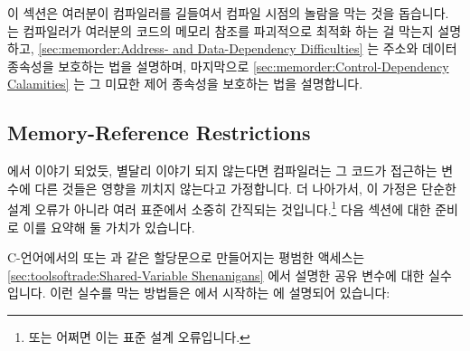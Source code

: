 이 섹션은 여러분이 컴파일러를 길들여서 컴파일 시점의 놀람을 막는 것을 돕습니다.
는 컴파일러가 여러분의 코드의 메모리 참조를 파괴적으로 최적화 하는 걸 막는지
설명하고,
\cref{sec:memorder:Address- and Data-Dependency Difficulties}
는 주소와 데이터 종속성을 보호하는 법을 설명하며, 마지막으로
\cref{sec:memorder:Control-Dependency Calamities}
는 그 미묘한 제어 종속성을 보호하는 법을 설명합니다.

\subsection{Memory-Reference Restrictions}
\label{sec:memorder:Memory-Reference Restrictions}

 에서 이야기 되었듯, 별달리
이야기 되지 않는다면 컴파일러는 그 코드가 접근하는 변수에 다른 것들은 영향을
끼치지 않는다고 가정합니다.
더 나아가서, 이 가정은 단순한 설계 오류가 아니라 여러 표준에서 소중히 간직되는
것입니다.\footnote{
	또는 어쩌면 이는 표준 설계 오류입니다.}
다음 섹션에 대한 준비로 이를 요약해 둘 가치가 있습니다.

C-언어에서의  또는  과 같은 할당문으로 만들어지는 평범한
액세스는
\cref{sec:toolsoftrade:Shared-Variable Shenanigans} 에서 설명한 공유 변수에
대한 실수입니다.
이런 실수를 막는 방법들은
에서 시작하는
에 설명되어 있습니다:

